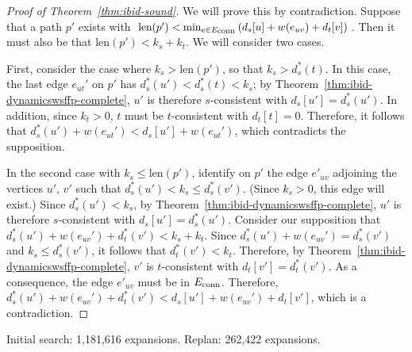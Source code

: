 \begin{proof}[Proof of Theorem~\ref{thm:ibid-sound}]
We will prove this by contradiction.
Suppose that a path $p'$ exists with
$\mbox{len}(p') < \min_{e \in E_{\mbox{\scriptsize conn}}} \left( d_s[u] + w(e_{uv}) + d_t[v] \right)$.
Then it must also be that
$\mbox{len}(p') < k_s + k_t$.
We will consider two cases.

First, consider the case where $k_s > \mbox{len}(p')$,
so that $k_s > d_s^*(t)$.
In this case,
the last edge $e_{ut}'$ on $p'$
has $d_s^*(u') < d_s^*(t) < k_s$;
by Theorem~\ref{thm:ibid-dynamicswsffp-complete},
$u'$ is therefore $s$-consistent with $d_s[u'] = d_s^*(u')$.
In addition,
since $k_t > 0$,
$t$ must be $t$-consistent with $d_t[t] = 0$.
Therefore,
it follows that $d_s^*(u') + w(e_{ut}') < d_s[u'] + w(e_{ut}')$,
which contradicts the supposition.

In the second case with $k_s \leq \mbox{len}(p')$,
identify on $p'$ the edge $e'_{uv}$ adjoining the vertices $u'$, $v'$
such that $d_s^*(u') < k_s \leq d_s^*(v')$.
(Since $k_s > 0$, this edge will exist.)
Since $d_s^*(u') < k_s$,
by Theorem~\ref{thm:ibid-dynamicswsffp-complete},
$u'$ is therefore $s$-consistent with $d_s[u'] = d_s^*(u')$.
Consider our supposition that
$d_s^*(u') + w(e_{uv}') + d_t^*(v') < k_s + k_t$.
Since $d_s^*(u') + w(e_{uv}') = d_s^*(v')$
and $k_s \leq d_s^*(v')$,
it follows that
$d_t^*(v') < k_t$.
Therefore,
by Theorem~\ref{thm:ibid-dynamicswsffp-complete},
$v'$ is $t$-consistent with $d_t[v'] = d_t^*(v')$.
As a consequence,
the edge $e'_{uv}$ must be in $E_{\mbox{\scriptsize conn}}$.
Therefore,
$d_s^*(u') + w(e_{uv}') + d_t^*(v')
   < d_s[u'] + w(e_{uv}') + d_t[v']$,
which is a contradiction.
\end{proof}

\begin{marginfigure}%
   \centering%
   
   \caption{Initial search: 1,181,616 expansions.
      Replan: 262,422 expansions.}%
\end{marginfigure}






